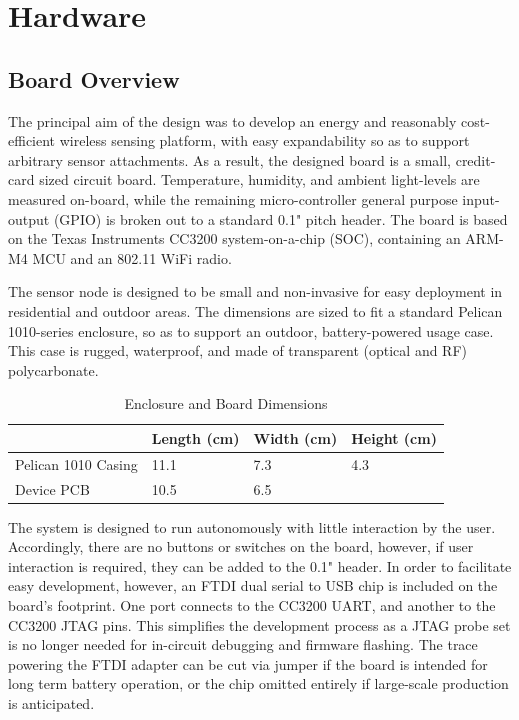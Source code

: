 \chapter{Hardware}

\section{Board Overview}
The principal aim of the design was to develop an energy and reasonably cost-efficient wireless sensing platform, with easy expandability so as to support arbitrary sensor attachments. As a result, the designed board is a small, credit-card sized circuit board. Temperature, humidity, and ambient light-levels are measured on-board, while the remaining micro-controller general purpose input-output (GPIO) is broken out to a standard 0.1" pitch header. The board is based on the Texas Instruments CC3200 system-on-a-chip (SOC), containing an ARM-M4 MCU and an 802.11 WiFi radio.


The sensor node is designed to be small and non-invasive for easy deployment in residential and outdoor areas. The dimensions are sized to fit a standard Pelican 1010-series enclosure, so as to support an outdoor, battery-powered usage case. This case is rugged, waterproof, and made of transparent (optical and RF) polycarbonate.

\begin{table}[h]
\begin{tabular}{@{}l|lll@{}}
                    & Length (cm) & Width (cm) & Height (cm) \\ \midrule
Pelican 1010 Casing & 11.1        & 7.3        & 4.3         \\
Device PCB          & 10.5        & 6.5        &            
\end{tabular}
\caption{Enclosure and Board Dimensions}
\label{dimensions}
\end{table}

The system is designed to run autonomously with little interaction by the user. Accordingly, there are no buttons or switches on the board, however, if user interaction is required, they can be added to the 0.1" header. In order to facilitate easy development, however, an FTDI dual serial to USB chip is included on the board's footprint. One port connects to the CC3200 UART, and another to the CC3200 JTAG pins. This simplifies the development process as a JTAG probe set is no longer needed for in-circuit debugging and firmware flashing. The trace powering the FTDI adapter can be cut via jumper if the board is intended for long term battery operation, or the chip omitted entirely if large-scale production is anticipated.

